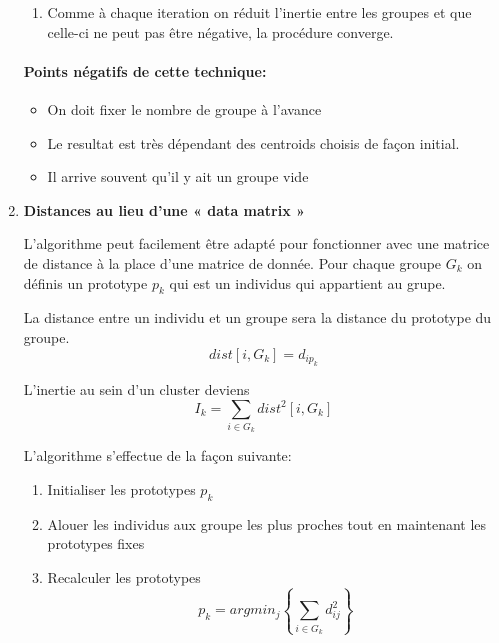 \documentclass[a4paper, 11pt, onecolumn]{article}
\begin{document}
\begin{enumerate}
\begin{enumerate}
\item Comme à chaque iteration on réduit l'inertie entre les groupes et que celle-ci ne peut pas être négative, la procédure converge.

\end{enumerate}

\paragraph{Points négatifs de cette technique:}
\begin{itemize}
\item On doit fixer le nombre de groupe à l'avance
\item Le resultat est très dépendant des centroids choisis de façon initial.
\item Il arrive souvent qu'il y ait un groupe vide
\end{itemize}

\item \textbf{Distances au lieu d’une « data matrix »}

L'algorithme peut facilement être adapté pour fonctionner avec une matrice de distance à la place d'une matrice de donnée. Pour chaque groupe $G_k$ on définis un prototype $p_k$ qui est un individus qui appartient au grupe. 

La distance entre un individu et un groupe sera la distance du prototype du groupe.
$$dist[i,G_k] = d_{ip_k}$$

L'inertie au sein d'un cluster deviens
$$I_k = \sum_{i\in G_k} dist^2[i, G_k]$$

L'algorithme s'effectue de la façon suivante:
\begin{enumerate}
\item Initialiser les prototypes $p_k$
\item Alouer les individus aux groupe les plus proches tout en maintenant les prototypes fixes
\item Recalculer les prototypes
$$p_k = argmin_j\left\{\sum_{i \in G_k} d^2_{ij}\right\}$$
\end{enumerate}

\end{enumerate}
\end{document}
